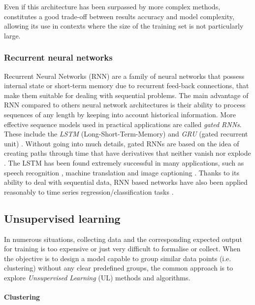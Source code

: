 Even if this architecture has been surpassed by more complex methods, constitutes a good trade-off between results accuracy and model complexity, allowing its use in contexts where the size of the training set is not particularly large.


\subsubsection{Recurrent neural networks} \label{Recurrent Neural Network}

Recurrent Neural Networks (RNN) \citep{rumelhart1986learning} are a family of neural networks that possess internal state or short-term memory due to recurrent feed-back connections, that make them suitable for dealing with sequential problems. The main advantage of RNN compared to others neural network architectures is their ability to process sequences of any length by keeping into account historical information. More effective sequence models used in practical applications are called \textit{gated RNNs}. These include the \textit{LSTM} (Long-Short-Term-Memory) \citep{hochreiter1997long} and \textit{GRU} (gated recurrent unit) \citep{cho2014properties}. Without going into much details, gated RNNs are based on the idea of creating paths through time that have derivatives that neither vanish nor explode \citep{goodfellow2016deep}. The LSTM has been found extremely successful in many applications, such as speech recognition \citep{graves2013hybrid}\citep{graves2014towards}, machine translation \citep{sutskever2014sequence} and image captioning \citep{kiros2014unifying}\citep{vinyals2015show}\citep{xu2015show}. Thanks to its ability to deal with sequential data, RNN based networks have also been applied reasonably to time series regression/classification tasks \citep{smirnov2018time}.  

\subsection{Unsupervised learning}

In numerous situations, collecting data and the corresponding expected output for training is too expensive or just very difficult to formalise or collect. When the objective is to design a model capable to group similar data points (i.e. clustering) without any clear predefined groups, the common approach is to explore \textit{Unsupervised Learning} (UL) methods and algorithms.

\paragraph{Clustering}

